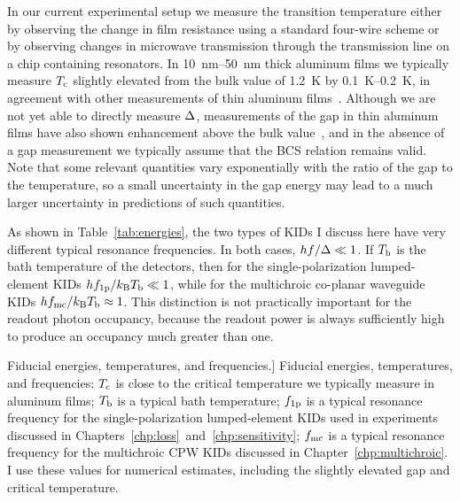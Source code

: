 In our current experimental setup we measure the transition temperature either by observing the change in film resistance using a standard four-wire scheme or by observing changes in microwave transmission through the transmission line on a chip containing resonators.
In \SIrange{10}{50}{nm} thick aluminum films we typically measure $T_{\mathrm{c}}$ slightly elevated from the bulk value of \SI{1.2}{K} by \SIrange{0.1}{0.2}{K}, in agreement with other measurements of thin aluminum films~\autocite{Townsend1972PRB}.
Although we are not yet able to directly measure $\Delta$, measurements of the gap in thin aluminum films have also shown enhancement above the bulk value~\autocite{Court2008SUST}, and in the absence of a gap measurement we typically assume that the BCS relation remains valid.
Note that some relevant quantities vary exponentially with the ratio of the gap to the temperature, so a small uncertainty in the gap energy may lead to a much larger uncertainty in predictions of such quantities.

As shown in Table~\ref{tab:energies}, the two types of KIDs I discuss here have very different typical resonance frequencies.
In both cases, $h f / \Delta \ll 1$.
If $T_{\mathrm{b}}$ is the bath temperature of the detectors, then for the single-polarization lumped-element KIDs $h f_{\mathrm{1p}} / k_\mathrm{B} T_{\mathrm{b}} \ll 1$, while for the multichroic co-planar waveguide KIDs $h f_{\mathrm{mc}} / k_\mathrm{B} T_{\mathrm{b}} \approx 1$.
This distinction is not practically important for the readout photon occupancy, because the readout power is always sufficiently high to produce an occupancy much greater than one.

\begin{table}[htb]
\centering
\caption
[Fiducial energies, temperatures, and frequencies.]
{
Fiducial energies, temperatures, and frequencies:
$T_{\mathrm{c}}$ is close to the critical temperature we typically measure in aluminum films;
$T_{\mathrm{b}}$ is a typical bath temperature; 
$f_{\mathrm{1p}}$ is a typical resonance frequency for the single-polarization lumped-element KIDs used in experiments discussed in Chapters~\ref{chp:loss}~and~\ref{chp:sensitivity};
$f_{\mathrm{mc}}$ is a typical resonance frequency for the multichroic CPW KIDs discussed in Chapter~\ref{chp:multichroic}.
I use these values for numerical estimates, including the slightly elevated gap and critical temperature.
}
\renewcommand{\arraystretch}{1.2}

\label{tab:energies}
\end{table}

